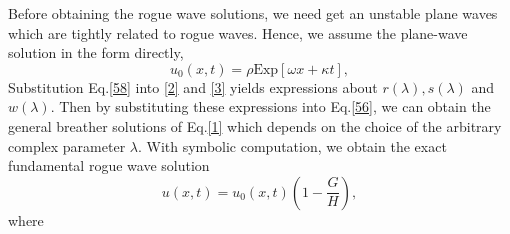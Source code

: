 \documentclass[12pt]{article}
\begin{document}
Before obtaining the rogue wave solutions, we need get an unstable plane waves which are tightly related to rogue waves\cite{14,15}. Hence, we assume the plane-wave solution in the form directly,
\begin{equation}\label{58}
  u_{0}(x,t) = \rho \mathrm{Exp}[\omega x + \kappa t],
\end{equation}
Substitution Eq.\eqref{58} into \eqref{2} and \eqref{3} yields expressions about $r(\lambda), s(\lambda)$ and $w(\lambda)$. Then by substituting these expressions into Eq.\eqref{56}, we can obtain the general breather solutions of Eq.\eqref{1} which depends on the choice of the arbitrary complex parameter $\lambda$. With symbolic computation, we obtain the exact fundamental rogue wave solution
\begin{equation}\label{59}
u(x,t) = u_{0}(x,t)\left(1-\frac{G}{H}\right),
\end{equation}
where
\end{document}
